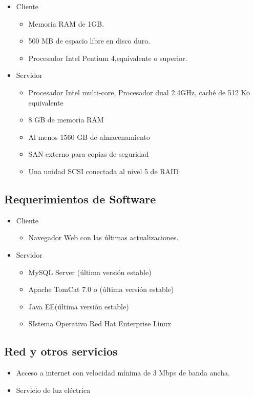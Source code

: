 \begin{itemize}
	\item Cliente
	\begin{itemize}
		Computadora o tablet con las siguientes especificaciones mínimas: 
		\item Memoria RAM de 1GB.
		\item 500 MB de espacio libre en disco duro.
		\item Procesador Intel Pentium 4,equivalente o superior.
	\end{itemize}
	\item Servidor
	\begin{itemize}
		\item Procesador Intel multi-core, Procesador dual 2.4GHz, caché de 512 Ko equivalente
		\item 8 GB de memoria RAM
		\item Al menos 1560 GB de almacenamiento
		\item SAN externo para copias de seguridad
		\item Una unidad SCSI conectada al nivel 5 de RAID
	\end{itemize}
\end{itemize}
\subsection{Requerimientos de Software}
\begin{itemize}
	\item Cliente
	\begin{itemize}
		\item Navegador Web con las últimas actualizaciones.
	\end{itemize}
	\item Servidor
	\begin{itemize}
		\item MySQL Server (última versión estable)
		\item Apache TomCat 7.0 o (última versión estable)
		\item Java EE(última versión estable)
		\item SIstema Operativo Red Hat Enterprise Linux
		
	\end{itemize}
\end{itemize}
\subsection{Red y otros servicios}
	\begin{itemize}
		\item Acceso a internet con velocidad mínima de 3 Mbps de banda ancha.
		\item Servicio de luz eléctrica
	\end{itemize}
